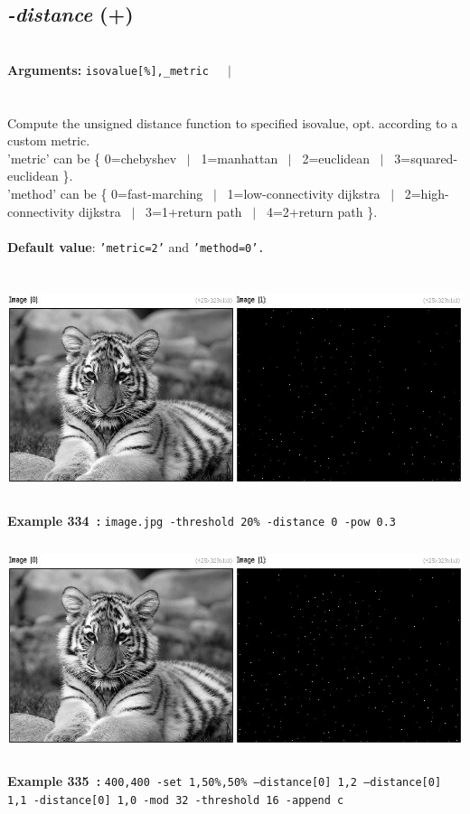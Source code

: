 \documentclass[a4paper,11pt,twoside]{book}
\begin{document}
\subsection{\emph{-distance} (+)}\vspace*{-0.5em}
~\\\textbf{Arguments: } 
{\small \texttt{isovalue[\%],\_metric}}~~~$|$\\
\\~\\
Compute the unsigned distance function to specified isovalue, opt. according to a custom metric.
~\\'metric' can be \{ 0=chebyshev ~$|$~ 1=manhattan ~$|$~ 2=euclidean ~$|$~ 3=squared-euclidean \}.
~\\'method' can be \{ 0=fast-marching ~$|$~ 1=low-connectivity dijkstra ~$|$~ 2=high-connectivity dijkstra ~$|$~ 3=1+return path ~$|$~ 4=2+return path \}.
~\\~\\\textbf{Default value}: {\small \texttt{'metric=2'} and \texttt{'method=0'.}}
\begin{center}\includegraphics[keepaspectratio=true,height=7cm,width=\textwidth]{img/gmic_def334.jpg}\\
{\footnotesize \textbf{Example 334~:} \texttt{image.jpg -threshold 20\% -distance 0 -pow 0.3}}
\\\includegraphics[keepaspectratio=true,height=7cm,width=\textwidth]{img/gmic_def335.jpg}\\
{\footnotesize \textbf{Example 335~:} \texttt{400,400 -set 1,50\%,50\% --distance[0] 1,2 --distance[0] 1,1 -distance[0] 1,0 -mod 32 -threshold 16 -append c}}
\end{center}
\end{document}

